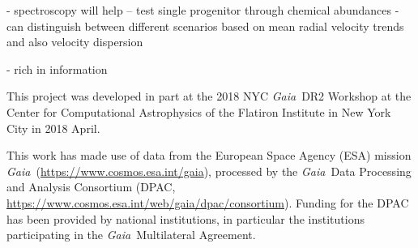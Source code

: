 \documentclass[twocolumn]{aastex62}
\newcommand{\acronym}[1]{{\small{#1}}}
\newcommand{\gaia}{\textsl{Gaia}}
\begin{document}
- spectroscopy will help -- test single progenitor through chemical abundances
- can distinguish between different scenarios based on mean radial velocity trends and also velocity dispersion

- rich in information


\acknowledgements


This project was developed in part at the 2018 \acronym{NYC} \gaia\ \acronym{DR2} Workshop at the Center for Computational Astrophysics of the Flatiron Institute in New York City in 2018 April.

This work has made use of data from the European Space Agency (\acronym{ESA}) mission \gaia\ (\url{https://www.cosmos.esa.int/gaia}), processed by the \gaia\ Data Processing and Analysis Consortium (\acronym{DPAC}, \url{https://www.cosmos.esa.int/web/gaia/dpac/consortium}). Funding for the \acronym{DPAC} has been provided by national institutions, in particular the institutions participating in the \gaia\ Multilateral Agreement.
\end{document}
